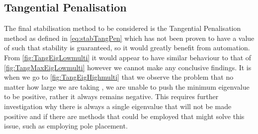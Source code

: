 \subsection{Tangential Penalisation}

The final stabilisation method to be considered is the Tangential Penalisation method as defined in \autoref{eq:stabTangPen} which has not been proven to have a value of \mgamma such that stability is guaranteed, so it would greatly benefit from automation. From \autoref{fig:TangEigLowmulti} it would appear to have similar behaviour to that of \autoref{fig:TangMaxEigLowmulti} however we cannot make any conclusive findings. It is when we go to \autoref{fig:TangEigHighmulti} that we observe the problem that no matter how large we are taking \mgamma, we are unable to push the minimum eigenvalue to be positive, rather it always remains negative. This requires further investigation why there is always a single eigenvalue that will not be made positive and if there are methods that could be employed that might solve this issue, such as employing pole placement.
